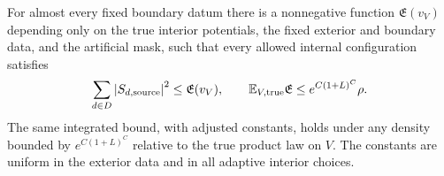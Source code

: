 \begin{proposition}\label{trans:envelope}
For almost every fixed boundary datum there is a nonnegative function
$\mathfrak E(v_V)$ depending only on the true interior potentials,
the fixed exterior and boundary data, and the artificial mask, such
that every allowed internal configuration satisfies
\begin{equation}
 \sum_{d\in D}\left\lvert S_{d,\rm source}\right\rvert^2
 \le\mathfrak E(v_V),\qquad
 \mathbb E_{V,\rm true}\mathfrak E\le e^{C(1+L)^C}\rho.
 \label{trans:envelope-bound}
\end{equation}
The same integrated bound, with adjusted constants, holds under any
density bounded by $e^{C(1+L)^C}$ relative to the true product law on
$V$. The constants are uniform in the exterior data and in all
adaptive interior choices.
\end{proposition}


